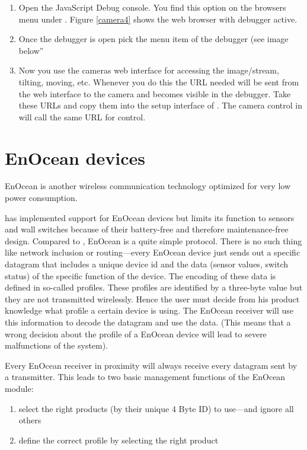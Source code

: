 \begin{enumerate}
\item Open the JavaScript Debug console. You find this option on the browsers menu under
. Figure \ref{camera4} shows the web browser with debugger active.
\item Once the debugger is open pick the menu item  of the debugger (see image below”
\item Now you use the cameras web interface for accessing the image/stream, tilting, moving, 
etc. Whenever you do this the URL needed will be sent from the web interface to the camera 
and becomes visible in the debugger. Take these URLs and copy them into the setup 
interface of . The camera control in \zwave will call the same URL for 
control.
\end{enumerate}

\section {EnOcean devices}

EnOcean is another wireless communication technology optimized for very low power consumption.

\zway has implemented support for EnOcean devices but limits its function to sensors and 
wall switches because of their battery-free and therefore maintenance-free design. Compared 
to \zwave, EnOcean is a quite simple protocol. There is no such thing like network 
inclusion or routing---every EnOcean device just sends out a specific datagram that 
includes a unique device id and the data (sensor values, switch status) of the specific 
function of the device. The encoding of these data is defined in so-called profiles. These 
profiles are identified by a three-byte value but they are not transmitted wirelessly. 
Hence the user must decide from his product knowledge what profile a certain device is 
using. The EnOcean receiver will use this information to decode the datagram and use the 
data. (This means that a wrong decision about the profile of a EnOcean device will lead 
to severe malfunctions of the system).


Every EnOcean receiver in proximity will always receive every datagram sent by a transmitter. 
This leads to two basic management functions of the EnOcean module:
\begin{enumerate}
\item select the right products (by their unique 4 Byte ID) to use---and ignore all others
\item define the correct profile by selecting the right product
\end{enumerate}


